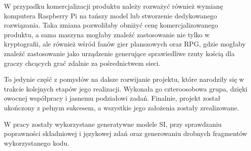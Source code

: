 W przypadku komercjalizacji produktu należy rozważyć również wymianę komputera Raspberry Pi na tańszy model lub stworzenie dedykowanego rozwiązania.
Taka zmiana pozwoliłaby obniżyć cenę komercjalizowanego produktu, a sama maszyna mogłaby znaleźć zastosowanie nie tylko w kryptografii,
ale również wśród fanów gier planszowych oraz RPG, gdzie mogłaby znaleźć zastosowanie jako urządzenie generujące sprawiedliwe rzuty kością
dla graczy chcących grać zdalnie za pośrednictwem sieci.

To jedynie część z pomysłów na dalsze rozwijanie projektu, które narodziły się w trakcie kolejnych etapów jego realizacji.
Wykonała go czteroosobowa grupa, dzięki owocnej współpracy i jasnemu podziałowi zadań. 
Finalnie, projekt został ukończony z pełnym sukcesem, a wszystkie jego założenia zostały zrealizowane.

W pracy zostały wykorzystane generatywne modele SI, przy sprawdzaniu poprawności składniowej i językowej zdań oraz generowaniu drobnych fragmentów wykorzystanego kodu.
